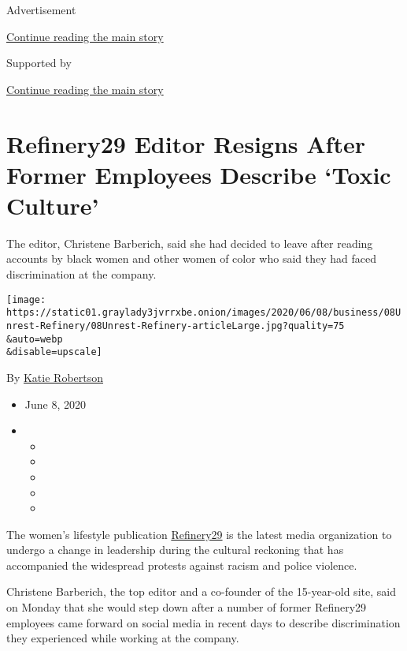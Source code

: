 Advertisement

\protect\hyperlink{after-top}{Continue reading the main story}

Supported by

\protect\hyperlink{after-sponsor}{Continue reading the main story}

\hypertarget{refinery29-editor-resigns-after-former-employees-describe-toxic-culture}{%
\section{Refinery29 Editor Resigns After Former Employees Describe
`Toxic
Culture'}\label{refinery29-editor-resigns-after-former-employees-describe-toxic-culture}}

The editor, Christene Barberich, said she had decided to leave after
reading accounts by black women and other women of color who said they
had faced discrimination at the company.

\texttt{[image: https://static01.graylady3jvrrxbe.onion/images/2020/06/08/business/08Unrest-Refinery/08Unrest-Refinery-articleLarge.jpg?quality=75\\\&auto=webp\\\&disable=upscale]}

By \href{https://www.nytimes3xbfgragh.onion/by/katie-robertson}{Katie
Robertson}

\begin{itemize}
\item
  June 8, 2020
\item
  \begin{itemize}
  \item
  \item
  \item
  \item
  \item
  \end{itemize}
\end{itemize}

The women's lifestyle publication
\href{https://www.nytimes3xbfgragh.onion/2019/10/02/business/vice-media-refinery29.html}{Refinery29}
is the latest media organization to undergo a change in leadership
during the cultural reckoning that has accompanied the widespread
protests against racism and police violence.

Christene Barberich, the top editor and a co-founder of the 15-year-old
site, said on Monday that she would step down after a number of former
Refinery29 employees came forward on social media in recent days to
describe discrimination they experienced while working at the company.

